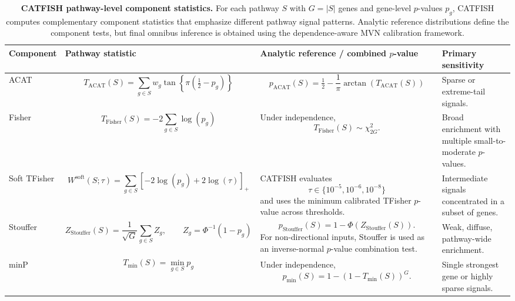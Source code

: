 \documentclass[unnumsec,webpdf,contemporary,large]{oup-authoring-template}%
\theoremstyle{thmstyleone}%
\theoremstyle{thmstyletwo}%
\theoremstyle{thmstylethree}%
\begin{document}
\begin{table}[!t]
\centering
\caption{\textbf{CATFISH pathway-level component statistics.}
For each pathway \(S\) with \(G=|S|\) genes and gene-level \(p\)-values \(p_g\), CATFISH computes complementary component statistics that emphasize different pathway signal patterns. Analytic reference distributions define the component tests, but final omnibus inference is obtained using the dependence-aware MVN calibration framework.}
\label{tab:catfish_component_statistics}
\small
\renewcommand{\arraystretch}{1.25}
\begin{tabular}{p{} p{} p{} p{}}
\hline
\textbf{Component} & \textbf{Pathway statistic} & \textbf{Analytic reference / combined \(p\)-value} & \textbf{Primary sensitivity} \\
\hline

ACAT &
\[
T_{\mathrm{ACAT}}(S)=
\sum_{g\in S} w_g \tan\left\{\pi\left(\tfrac{1}{2}-p_g\right)\right\}
\]
&
\[
p_{\mathrm{ACAT}}(S)=
\tfrac{1}{2}-\frac{1}{\pi}\arctan\left(T_{\mathrm{ACAT}}(S)\right)
\]
&
Sparse or extreme-tail signals. \\

Fisher &
\[
T_{\mathrm{Fisher}}(S)=
-2\sum_{g\in S}\log(p_g)
\]
&
Under independence,
\[
T_{\mathrm{Fisher}}(S)\sim\chi^2_{2G}.
\]
&
Broad enrichment with multiple small-to-moderate \(p\)-values. \\

Soft TFisher &
\[
W^{\mathrm{soft}}(S;\tau)=
\sum_{g\in S}
\left[-2\log(p_g)+2\log(\tau)\right]_+
\]
&
CATFISH evaluates
\[
\tau\in\{10^{-5},10^{-6},10^{-8}\}
\]
and uses the minimum calibrated TFisher \(p\)-value across thresholds. &
Intermediate signals concentrated in a subset of genes. \\

Stouffer &
\[
Z_{\mathrm{Stouffer}}(S)=
\frac{1}{\sqrt{G}}\sum_{g\in S} Z_g,
\qquad
Z_g=\Phi^{-1}(1-p_g)
\]
&
\[
p_{\mathrm{Stouffer}}(S)=
1-\Phi\left(Z_{\mathrm{Stouffer}}(S)\right).
\]
For non-directional inputs, Stouffer is used as an inverse-normal \(p\)-value combination test. &
Weak, diffuse, pathway-wide enrichment. \\

minP &
\[
T_{\min}(S)=\min_{g\in S}p_g
\]
&
Under independence,
\[
p_{\min}(S)=
1-\left(1-T_{\min}(S)\right)^G.
\]
&
Single strongest gene or highly sparse signals. \\

\hline
\end{tabular}
\end{table}
\end{document}
